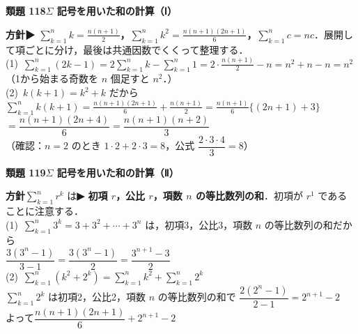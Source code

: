 \documentclass[a4paper,11pt]{ltjsarticle}
\newcommand{\ans}[2]{\Needspace{5\baselineskip}\vspace{6pt}%
  {\sffamily\bfseries 類題 #1\quad #2}\par}
\newcommand{\point}[1]{\textsf{\bfseries ▶ #1}}
\begin{document}
\ans{118}{$\Sigma$ 記号を用いた和の計算（Ⅰ）}
\begin{kai}
\textbf{方針}\quad \point{$\displaystyle\sum_{k=1}^nk=\frac{n(n+1)}2$，$\displaystyle\sum_{k=1}^nk^2=\frac{n(n+1)(2n+1)}6$，$\displaystyle\sum_{k=1}^nc=nc$}．展開して項ごとに分け，最後は共通因数でくくって整理する．\\[2pt]
(1)\ $\displaystyle\sum_{k=1}^n(2k-1)=2\sum_{k=1}^nk-\sum_{k=1}^n1=2\cdot\frac{n(n+1)}2-n=n^2+n-n=n^2$\\
\hspace*{1.5em}（1から始まる奇数を $n$ 個足すと $n^2$．）\\[2pt]
(2)\ $k(k+1)=k^2+k$ だから\\
\hspace*{1.5em}$\displaystyle\sum_{k=1}^nk(k+1)=\frac{n(n+1)(2n+1)}6+\frac{n(n+1)}2=\frac{n(n+1)}6\{(2n+1)+3\}$\\
\hspace*{1.5em}$=\dfrac{n(n+1)(2n+4)}6=\dfrac{n(n+1)(n+2)}3$\\
\hspace*{1.5em}（確認：$n=2$ のとき $1\cdot2+2\cdot3=8$，公式 $\dfrac{2\cdot3\cdot4}3=8$）
\end{kai}

\ans{119}{$\Sigma$ 記号を用いた和の計算（Ⅱ）}
\begin{kai}
\textbf{方針}\quad $\displaystyle\sum_{k=1}^nr^k$ は\point{初項 $r$，公比 $r$，項数 $n$ の等比数列の和}．初項が $r^1$ であることに注意する．\\[2pt]
(1)\ $\displaystyle\sum_{k=1}^n3^k=3+3^2+\cdots+3^n$ は，初項3，公比3，項数 $n$ の等比数列の和だから\\
\hspace*{1.5em}$\dfrac{3(3^n-1)}{3-1}=\dfrac{3(3^n-1)}2=\dfrac{3^{n+1}-3}2$\\[2pt]
(2)\ $\displaystyle\sum_{k=1}^n(k^2+2^k)=\sum_{k=1}^nk^2+\sum_{k=1}^n2^k$\\
\hspace*{1.5em}$\displaystyle\sum_{k=1}^n2^k$ は初項2，公比2，項数 $n$ の等比数列の和で $\dfrac{2(2^n-1)}{2-1}=2^{n+1}-2$\\
\hspace*{1.5em}よって\quad $\dfrac{n(n+1)(2n+1)}6+2^{n+1}-2$
\end{kai}
\end{document}
